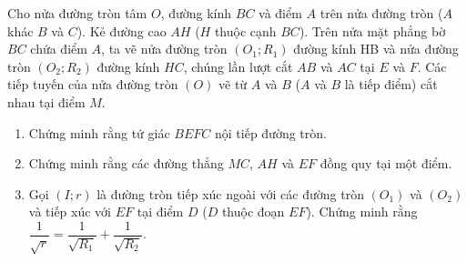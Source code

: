 \begin{ex}%
	Cho nửa đường tròn tâm $O$, đường kính $ BC $ và điểm $ A $ trên nửa đường tròn ($ A $ khác $B$ và $ C $). Kẻ đường cao $ AH $ ($ H $ thuộc cạnh $ BC $). Trên nửa mặt phẳng bờ $ BC $ chứa điểm $ A $, ta vẽ nửa đường tròn $ (O_1;R_1) $ đường kính HB và nửa đường tròn $ (O_2;R_2) $ đường kính $ HC $, chúng lần lượt cắt $ AB $ và $ AC $ tại $ E $ và $ F $. Các tiếp tuyến của nửa đường tròn $ (O) $ vẽ từ $ A $ và $ B $ ($ A $ và $ B $ là tiếp điểm) cắt nhau tại điểm $ M $.
	\begin{enumerate}
		\item Chứng minh rằng tứ giác $ BEFC $ nội tiếp đường tròn.
		\item Chứng minh rằng các đường thẳng $ MC $, $ AH $ và $ EF $ đồng quy tại một điểm.
		\item Gọi $ (I;r) $ là đường tròn tiếp xúc ngoài với các đường tròn $ (O_1) $ và $ (O_2) $ và tiếp xúc với $ EF $ tại điểm $ D $ ($ D $ thuộc đoạn $ EF $). Chứng minh rằng $\dfrac{1}{\sqrt{r}}=\dfrac{1}{\sqrt{R_1}}+\dfrac{1}{\sqrt{R_2}}.$
	\end{enumerate}
\end{ex}
